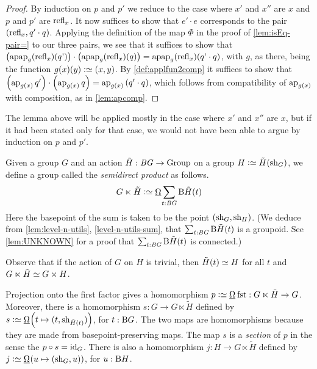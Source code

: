 \begin{proof}
  By induction on $p$ and $p'$ we reduce to the case where $x'$ and $x''$ are $x$ and $p$ and $p'$ are $\refl x$. 
  It now suffices to show that $e' \cdot e$ corresponds to the pair $(\refl x , q' \cdot q)$.
  Applying the definition of the map $\Phi$ in the proof of \cref{lem:isEq-pair=} to our three pairs, we see that it suffices to show that
  $\left( \apap g {\refl x} {q'} \right) \cdot \left( \apap g {\refl x} {q} \right) = \apap g {\refl x} {q' \cdot q}$, with $g$, as there, being the function $ g(x)(y) \defeq (x,y)$.
  By \cref{def:applfun2comp} it suffices to show that $\left( \ap {g(x)} {q'} \right) \cdot \left( \ap {g(x)} {q} \right) = \ap {g(x)} {(q' \cdot q)}$, which follows from
  compatibility of $\ap {g(x)}$ with composition, as in \cref{lem:apcomp}.
\end{proof}

The lemma above will be applied mostly in the case where $x'$ and $x''$ are $x$, but if it had been stated only for that case, we would not have
been able to argue by induction on $p$ and $p'$.

\begin{definition}\label{def:semidirect-product}
  Given a group $G$ and an action $\tilde H : \mathit{B}\mathit{G} \to \mathrm{Group}$ on a group $H \defeq \tilde H(\sh_G)$, we define a group called the {\em
    semidirect product} as follows.
  $$G \ltimes \tilde H \defeq \mkgroup { \sum_{t:\BG} \B \tilde H(t) }$$
  Here the basepoint of the sum is taken to be the point $(\mathrm{sh}_G,\mathrm{sh}_H)$.
  (We deduce from \cref{lem:level-n-utils}, \cref{level-n-utils-sum}, that $\sum_{t:\mathit{B}\mathit{G}} \mathrm{B} \tilde H(t)$ is a groupoid.
  See \cref{lem:UNKNOWN} for a proof that $\sum_{t:\mathit{B}\mathit{G}} \mathrm{B} \tilde H(t)$ is connected.)
\end{definition}

Observe that if the action of $G$ on $H$ is trivial, then $\tilde H(t) \jdeq H$ for all $t$ and $G \ltimes \tilde H \jdeq G \times H$.

Projection onto the first factor gives a homomorphism $p \defeq \mkgroup \fst : G \ltimes \tilde H \to G$.
Moreover, there is a homomorphism $s : G \to G \ltimes \tilde H$ defined by 
$ s \defeq \mkgroup {\left( t \mapsto (t,\sh_{\tilde H(t)}) \right) }$, for $t : \mathrm{B} G$.
The two maps are homomorphisms because they are made from basepoint-preserving maps.
The map $s$ is a \emph{section} of $p$ in the sense the $p \circ s = \mathord{\mathrm{id}}_G$.
There is also a homomorphism $j : H \to G \ltimes \tilde H$ defined by $j \defeq \mkgroup { \left( u \mapsto (\sh_G,u) \right) }$, for $u : \mathrm{B} H$.

